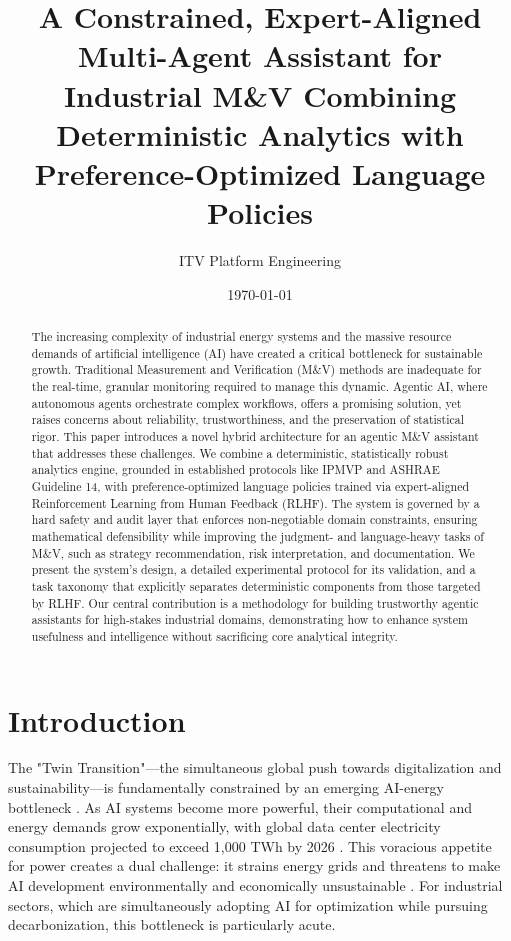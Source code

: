 \documentclass[11pt,a4paper]{article}
\begin{document}

\title{A Constrained, Expert-Aligned Multi-Agent Assistant for Industrial M\&V Combining Deterministic Analytics with Preference-Optimized Language Policies}
\author{ITV Platform Engineering}
\date{\today}
\maketitle

\begin{abstract}
The increasing complexity of industrial energy systems and the massive resource demands of artificial intelligence (AI) have created a critical bottleneck for sustainable growth. Traditional Measurement and Verification (M\&V) methods are inadequate for the real-time, granular monitoring required to manage this dynamic. Agentic AI, where autonomous agents orchestrate complex workflows, offers a promising solution, yet raises concerns about reliability, trustworthiness, and the preservation of statistical rigor. This paper introduces a novel hybrid architecture for an agentic M\&V assistant that addresses these challenges. We combine a deterministic, statistically robust analytics engine, grounded in established protocols like IPMVP and ASHRAE Guideline 14, with preference-optimized language policies trained via expert-aligned Reinforcement Learning from Human Feedback (RLHF). The system is governed by a hard safety and audit layer that enforces non-negotiable domain constraints, ensuring mathematical defensibility while improving the judgment- and language-heavy tasks of M\&V, such as strategy recommendation, risk interpretation, and documentation. We present the system's design, a detailed experimental protocol for its validation, and a task taxonomy that explicitly separates deterministic components from those targeted by RLHF. Our central contribution is a methodology for building trustworthy agentic assistants for high-stakes industrial domains, demonstrating how to enhance system usefulness and intelligence without sacrificing core analytical integrity.
\end{abstract}

\section{Introduction}

The "Twin Transition"—the simultaneous global push towards digitalization and sustainability—is fundamentally constrained by an emerging AI-energy bottleneck \cite{iea2024electricity}. As AI systems become more powerful, their computational and energy demands grow exponentially, with global data center electricity consumption projected to exceed 1,000 TWh by 2026 \cite{iea2024electricity}. This voracious appetite for power creates a dual challenge: it strains energy grids and threatens to make AI development environmentally and economically unsustainable \cite{strubell2019energy, schwartz2019green}. For industrial sectors, which are simultaneously adopting AI for optimization while pursuing decarbonization, this bottleneck is particularly acute.
\end{document}
